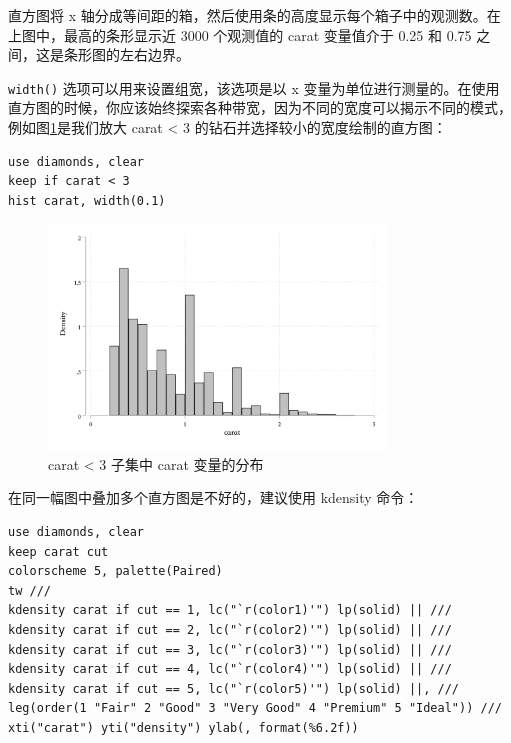 \documentclass[]{ctexbook}
\begin{document}
直方图将 x 轴分成等间距的箱，然后使用条的高度显示每个箱子中的观测数。在上图中，最高的条形显示近 3000 个观测值的 carat 变量值介于 0.25 和 0.75 之间，这是条形图的左右边界。

\texttt{width()} 选项可以用来设置组宽，该选项是以 x 变量为单位进行测量的。在使用直方图的时候，你应该始终探索各种带宽，因为不同的宽度可以揭示不同的模式，例如图\ref{fig:histsmallercarat}是我们放大 carat \textless{} 3 的钻石并选择较小的宽度绘制的直方图：

\begin{lstlisting}
use diamonds, clear
keep if carat < 3
hist carat, width(0.1)
\end{lstlisting}

\begin{figure}

{\centering \includegraphics[width=0.8\textwidth]{assets/histsmallercarat} 

}

\caption{carat < 3 子集中 carat 变量的分布}\label{fig:histsmallercarat}
\end{figure}

在同一幅图中叠加多个直方图是不好的，建议使用 kdensity 命令：

\begin{lstlisting}
use diamonds, clear
keep carat cut
colorscheme 5, palette(Paired)
tw ///
kdensity carat if cut == 1, lc("`r(color1)'") lp(solid) || ///
kdensity carat if cut == 2, lc("`r(color2)'") lp(solid) || ///
kdensity carat if cut == 3, lc("`r(color3)'") lp(solid) || ///
kdensity carat if cut == 4, lc("`r(color4)'") lp(solid) || ///
kdensity carat if cut == 5, lc("`r(color5)'") lp(solid) ||, ///
leg(order(1 "Fair" 2 "Good" 3 "Very Good" 4 "Premium" 5 "Ideal")) ///
xti("carat") yti("density") ylab(, format(%6.2f))
\end{lstlisting}
\end{document}
